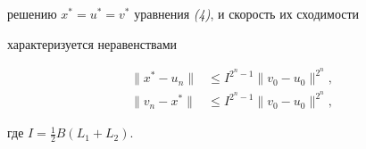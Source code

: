 \begin{thm}
решению $x^*=u^*=v^*$ уравнения {\em (4)}, и скорость их сходимости


характеризуется неравенствами


\begin{equation}


\begin{split}


\|x^*-u_n\|&\le I^{2^n-1}\|v_0-u_0\|^{2^n},\\


\|v_n-x^*\|&\le I^{2^n-1}\|v_0-u_0\|^{2^n},


\end{split}


\end{equation}


где $I=\frac{1}{2}B(L_1+L_2)$.


\end{thm}





